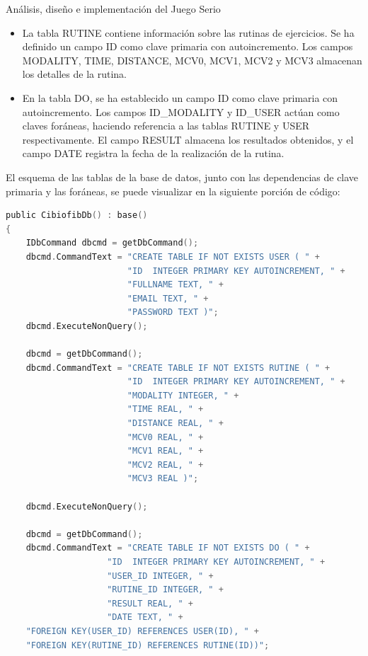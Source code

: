 \begin{thesischapter}{2} {Análisis, diseño e implementación del Juego Serio}
\begin{itemize}
        \item La tabla RUTINE contiene información sobre las rutinas de ejercicios. Se ha definido un campo ID como clave primaria con 
        autoincremento. Los campos MODALITY, TIME, DISTANCE, MCV0, MCV1, MCV2 y MCV3 almacenan los detalles de la rutina.
    
        \item En la tabla DO, se ha establecido un campo ID como clave primaria con autoincremento. Los campos ID\_MODALITY y ID\_USER actúan 
        como claves foráneas, haciendo referencia a las tablas RUTINE y USER respectivamente. El campo RESULT almacena los resultados obtenidos, 
        y el campo DATE registra la fecha de la realización de la rutina.
        
    \end{itemize}

    El esquema de las tablas de la base de datos, junto con las dependencias de clave primaria y las foráneas, se puede visualizar en la siguiente 
    porción de código:

\begin{center}
\begin{minipage}{0.8\textwidth}
\begin{lstlisting}[language=c,caption={Sección de código, constructor de la clase CibiofibDb}, label={code: database-code}]
public CibiofibDb() : base()
{
    IDbCommand dbcmd = getDbCommand();
    dbcmd.CommandText = "CREATE TABLE IF NOT EXISTS USER ( " +
                        "ID  INTEGER PRIMARY KEY AUTOINCREMENT, " +
                        "FULLNAME TEXT, " +
                        "EMAIL TEXT, " +
                        "PASSWORD TEXT )";
    dbcmd.ExecuteNonQuery();

    dbcmd = getDbCommand();
    dbcmd.CommandText = "CREATE TABLE IF NOT EXISTS RUTINE ( " +
                        "ID  INTEGER PRIMARY KEY AUTOINCREMENT, " +
                        "MODALITY INTEGER, " +
                        "TIME REAL, " +
                        "DISTANCE REAL, " +
                        "MCV0 REAL, " +
                        "MCV1 REAL, " +
                        "MCV2 REAL, " +
                        "MCV3 REAL )";

    dbcmd.ExecuteNonQuery();

    dbcmd = getDbCommand();
    dbcmd.CommandText = "CREATE TABLE IF NOT EXISTS DO ( " +
                    "ID  INTEGER PRIMARY KEY AUTOINCREMENT, " +
                    "USER_ID INTEGER, " +
                    "RUTINE_ID INTEGER, " +
                    "RESULT REAL, " +
                    "DATE TEXT, " +
    "FOREIGN KEY(USER_ID) REFERENCES USER(ID), " +
    "FOREIGN KEY(RUTINE_ID) REFERENCES RUTINE(ID))";


\end{lstlisting}
\end{minipage}
\end{center}
\end{thesischapter}
